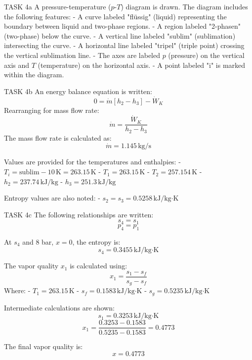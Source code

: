 TASK 4a  
A pressure-temperature (\(p\)-\(T\)) diagram is drawn. The diagram includes the following features:  
- A curve labeled "flüssig" (liquid) representing the boundary between liquid and two-phase regions.  
- A region labeled "2-phasen" (two-phase) below the curve.  
- A vertical line labeled "sublim" (sublimation) intersecting the curve.  
- A horizontal line labeled "tripel" (triple point) crossing the vertical sublimation line.  
- The axes are labeled \(p\) (pressure) on the vertical axis and \(T\) (temperature) on the horizontal axis.  
- A point labeled "i" is marked within the diagram.  

TASK 4b  
An energy balance equation is written:  
\[
0 = \dot{m} \left[ h_2 - h_3 \right] - \dot{W}_K
\]  
Rearranging for mass flow rate:  
\[
\dot{m} = \frac{\dot{W}_K}{h_2 - h_3}
\]  
The mass flow rate is calculated as:  
\[
\dot{m} = 1.145 \, \text{kg/s}
\]  

Values are provided for the temperatures and enthalpies:  
- \(T_i = \text{sublim} - 10 \, \text{K} = 263.15 \, \text{K}\)  
- \(T_1 = 263.15 \, \text{K}\)  
- \(T_2 = 257.154 \, \text{K}\)  
- \(h_2 = 237.74 \, \text{kJ/kg}\)  
- \(h_3 = 251.3 \, \text{kJ/kg}\)  

Entropy values are also noted:  
- \(s_2 = s_3 = 0.5258 \, \text{kJ/kg·K}\)  

TASK 4c  
The following relationships are written:  
\[
s_4 = s_1
\]  
\[
p_4 = p_1
\]  

At \(s_4\) and 8 bar, \(x = 0\), the entropy is:  
\[
s_4 = 0.3455 \, \text{kJ/kg·K}
\]  

The vapor quality \(x_1\) is calculated using:  
\[
x_1 = \frac{s_1 - s_f}{s_g - s_f}
\]  
Where:  
- \(T_1 = 263.15 \, \text{K}\)  
- \(s_f = 0.1583 \, \text{kJ/kg·K}\)  
- \(s_g = 0.5235 \, \text{kJ/kg·K}\)  

Intermediate calculations are shown:  
\[
s_1 = 0.3253 \, \text{kJ/kg·K}
\]  
\[
x_1 = \frac{0.3253 - 0.1583}{0.5235 - 0.1583} = 0.4773
\]  

The final vapor quality is:  
\[
x = 0.4773
\]